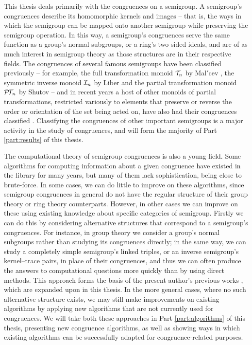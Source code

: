 This thesis deals primarily with the congruences on a semigroup.  A semigroup's
congruences describe its homomorphic kernels and images -- that is, the ways in
which the semigroup can be mapped onto another semigroup while preserving the
semigroup operation.  In this way, a semigroup's congruences serve the same
function as a group's normal subgroups, or a ring's two-sided ideals, and are of
as much interest in semigroup theory as those structures are in their respective
fields.  The congruences
of several famous semigroups have been classified previously -- for example, the
full transformation monoid $\mathcal{T}_n$ by Mal$'$cev \cite{malcev_1952}, the symmetric
inverse monoid $\mathcal{I}_n$ by Liber \cite{liber_1953} and the partial transformation
monoid $\mathcal{P\!T\!}_n$ by Shutov \cite{shutov_1988} -- and in recent years a host of
other monoids of partial transformations, restricted variously to elements that
preserve or reverse the order or orientation of the set being acted on, have
also had their congruences classified \cite{fernandes_2000, lisbon_ii,
  lisbon_i}.  Classifying the congruences of other important semigroups is a
major activity in the study of congruences, and will form the majority of Part
\ref{part:results} of this thesis.

The computational theory of semigroup congruences is also a young field.  Some
algorithms for computing information about a given congruence have existed in
the \GAP{} library for many years, but many of them lack sophistication, being
close to brute-force.  In some cases, we can do little to improve on these
algorithms, since semigroup congruences in general do not have the regular
structure of their group theory or ring theory counterparts.  However, in other
cases we can improve on these using existing knowledge about specific categories
of semigroup.  Firstly we can do this by considering alternative structures that
correspond to a semigroup's congruences.  For instance, in group theory we
consider a group's normal subgroups rather than studying its congruences
directly; in the same way, we can study a completely simple semigroup's linked
triples, or an inverse semigroup's kernel--trace pairs, in place of their
congruences, and thus we can often produce the answers to computational
questions more quickly than by using direct methods.  This approach forms the
basis of the present author's previous works \cite{mtorpey_pre_msc,
  mtorpey_msc}, which are expanded upon in this thesis. In the more general
cases, where no such alternative structure exists, we may still make
improvements on existing algorithms by applying new algorithms that are not
currently used for congruences.  We will take both these approaches in Part
\ref{part:algorithms} of this thesis, presenting new congruence algorithms, as
well as showing ways in which existing algorithms can be successfully adapted
for congruence-related purposes.

